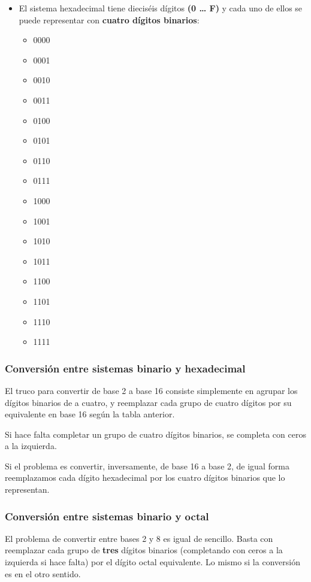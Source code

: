 \documentclass[spanish,a4paper,]{article}
\providecommand{\tightlist}{%
  \setlength{\itemsep}{0pt}\setlength{\parskip}{0pt}}
\begin{document}
\begin{itemize}
\tightlist
\item
  El sistema hexadecimal tiene dieciséis dígitos \textbf{(0 \ldots{} F)}
  y cada uno de ellos se puede representar con \textbf{cuatro dígitos
  binarios}:

  \begin{itemize}
  \tightlist
  \item
    0000
  \item
    0001
  \item
    0010
  \item
    0011
  \item
    0100
  \item
    0101
  \item
    0110
  \item
    0111
  \item
    1000
  \item
    1001
  \item
    1010
  \item
    1011
  \item
    1100
  \item
    1101
  \item
    1110
  \item
    1111
  \end{itemize}
\end{itemize}

\hypertarget{conversiuxf3n-entre-sistemas-binario-y-hexadecimal}{%
\subsubsection{Conversión entre sistemas binario y
hexadecimal}\label{conversiuxf3n-entre-sistemas-binario-y-hexadecimal}}

El truco para convertir de base 2 a base 16 consiste simplemente en
agrupar los dígitos binarios de a cuatro, y reemplazar cada grupo de
cuatro dígitos por su equivalente en base 16 según la tabla anterior.

Si hace falta completar un grupo de cuatro dígitos binarios, se completa
con ceros a la izquierda.

Si el problema es convertir, inversamente, de base 16 a base 2, de igual
forma reemplazamos cada dígito hexadecimal por los cuatro dígitos
binarios que lo representan.

\hypertarget{conversiuxf3n-entre-sistemas-binario-y-octal}{%
\subsubsection{Conversión entre sistemas binario y
octal}\label{conversiuxf3n-entre-sistemas-binario-y-octal}}

El problema de convertir entre bases 2 y 8 es igual de sencillo. Basta
con reemplazar cada grupo de \textbf{tres} dígitos binarios (completando
con ceros a la izquierda si hace falta) por el dígito octal equivalente.
Lo mismo si la conversión es en el otro sentido.
\end{document}
